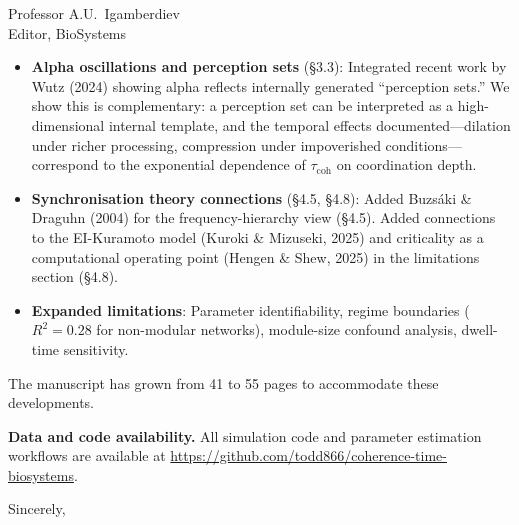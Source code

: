 \documentclass[12pt]{letter}
\begin{document}
\begin{letter}{Professor A.U.\ Igamberdiev\\Editor, BioSystems}
\begin{itemize}
\item \textbf{Alpha oscillations and perception sets} (\S3.3): Integrated recent work by Wutz (2024) showing alpha reflects internally generated ``perception sets.'' We show this is complementary: a perception set can be interpreted as a high-dimensional internal template, and the temporal effects documented---dilation under richer processing, compression under impoverished conditions---correspond to the exponential dependence of $\tau_{\mathrm{coh}}$ on coordination depth.

\item \textbf{Synchronisation theory connections} (\S4.5, \S4.8): Added Buzs\'{a}ki \& Draguhn (2004) for the frequency-hierarchy view (\S4.5). Added connections to the EI-Kuramoto model (Kuroki \& Mizuseki, 2025) and criticality as a computational operating point (Hengen \& Shew, 2025) in the limitations section (\S4.8).

\item \textbf{Expanded limitations}: Parameter identifiability, regime boundaries ($R^2 = 0.28$ for non-modular networks), module-size confound analysis, dwell-time sensitivity.
\end{itemize}

The manuscript has grown from 41 to 55 pages to accommodate these developments.

\medskip
\textbf{Data and code availability.} All simulation code and parameter estimation workflows are available at \url{https://github.com/todd866/coherence-time-biosystems}.

\closing{Sincerely,}

\end{letter}
\end{document}
